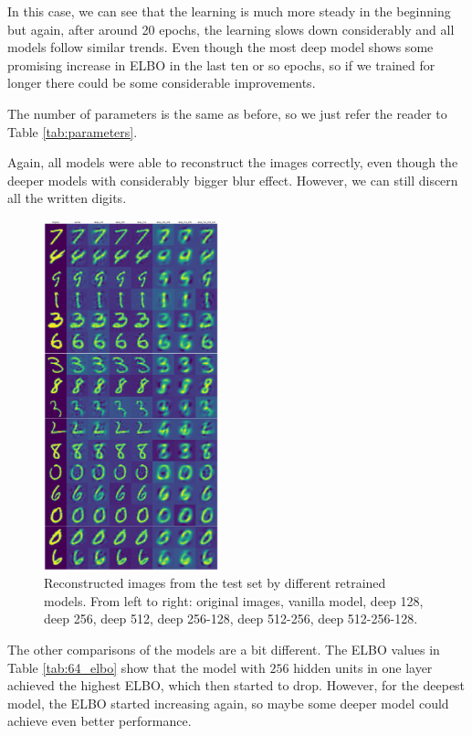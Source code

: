 \documentclass[a4paper,11pt]{article}
\begin{document}
In this case, we can see that the learning is much more steady in the beginning but again, after around 20 epochs, the learning slows down considerably and all models follow similar trends.
Even though the most deep model shows some promising increase in ELBO in the last ten or so epochs, so if we trained for longer there could be some considerable improvements.

The number of parameters is the same as before, so we just refer the reader to Table \ref{tab:parameters}.

Again, all models were able to reconstruct the images correctly, even though the deeper models with considerably bigger blur effect.
However, we can still discern all the written digits.

\begin{figure}[ht]
    \centering
    \includegraphics[width=0.45\textwidth]{../images/64_reconstructions.png}
    \caption{Reconstructed images from the test set by different retrained models. From left to right: original images, vanilla model, deep 128, deep 256, deep 512, deep 256-128, deep 512-256, deep 512-256-128.}
    \label{fig:64_reconstructions}
\end{figure}

The other comparisons of the models are a bit different.
The ELBO values in Table \ref{tab:64_elbo} show that the model with $256$ hidden units in one layer achieved the highest ELBO, which then started to drop.
However, for the deepest model, the ELBO started increasing again, so maybe some deeper model could achieve even better performance.
\end{document}
